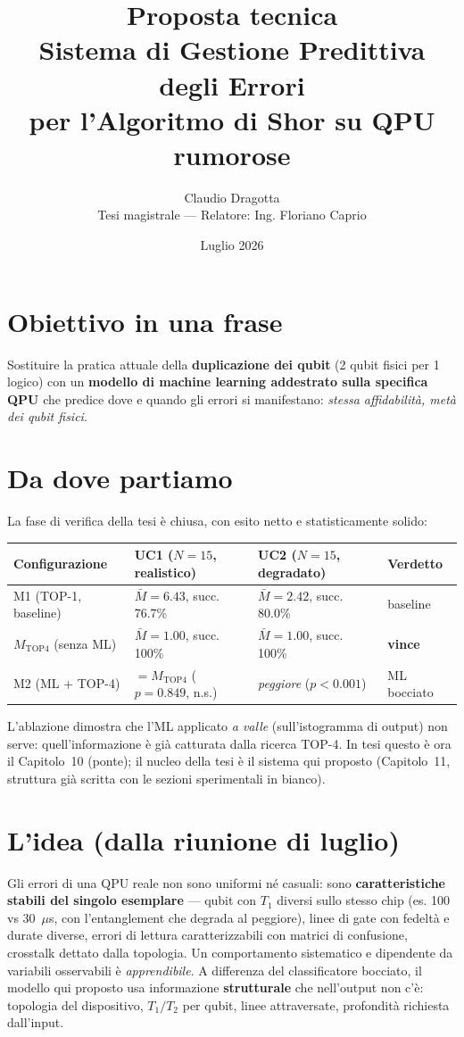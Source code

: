 \documentclass[11pt,a4paper]{article}
\title{\textbf{Proposta tecnica}\\[2mm]\Large Sistema di Gestione Predittiva degli Errori\\per l'Algoritmo di Shor su QPU rumorose}
\author{Claudio Dragotta\\\small Tesi magistrale --- Relatore: Ing. Floriano Caprio}
\date{Luglio 2026}
\begin{document}
\maketitle
\onehalfspacing

\section*{Obiettivo in una frase}
Sostituire la pratica attuale della \textbf{duplicazione dei qubit} (2 qubit fisici per 1 logico) con un \textbf{modello di machine learning addestrato sulla specifica QPU} che predice dove e quando gli errori si manifestano: \emph{stessa affidabilità, metà dei qubit fisici}.

\section{Da dove partiamo}
La fase di verifica della tesi è chiusa, con esito netto e statisticamente solido:

\begin{center}
\begin{tabular}{llll}
\toprule
\textbf{Configurazione} & \textbf{UC1} ($N{=}15$, realistico) & \textbf{UC2} ($N{=}15$, degradato) & \textbf{Verdetto} \\
\midrule
M1 (TOP-1, baseline) & $\bar{M}=6.43$, succ. 76.7\% & $\bar{M}=2.42$, succ. 80.0\% & baseline \\
$M_{\text{TOP4}}$ (senza ML) & $\bar{M}=1.00$, succ. 100\% & $\bar{M}=1.00$, succ. 100\% & \textbf{vince} \\
M2 (ML + TOP-4) & $=M_{\text{TOP4}}$ ($p=0.849$, n.s.) & \emph{peggiore} ($p<0.001$) & ML bocciato \\
\bottomrule
\end{tabular}
\end{center}

L'ablazione dimostra che l'ML applicato \emph{a valle} (sull'istogramma di output) non serve: quell'informazione è già catturata dalla ricerca TOP-4. In tesi questo è ora il Capitolo~10 (ponte); il nucleo della tesi è il sistema qui proposto (Capitolo~11, struttura già scritta con le sezioni sperimentali in bianco).

\section{L'idea (dalla riunione di luglio)}
Gli errori di una QPU reale non sono uniformi né casuali: sono \textbf{caratteristiche stabili del singolo esemplare} --- qubit con $T_1$ diversi sullo stesso chip (es. 100 vs 30~$\mu$s, con l'entanglement che degrada al peggiore), linee di gate con fedeltà e durate diverse, errori di lettura caratterizzabili con matrici di confusione, crosstalk dettato dalla topologia. Un comportamento sistematico e dipendente da variabili osservabili è \emph{apprendibile}. A differenza del classificatore bocciato, il modello qui proposto usa informazione \textbf{strutturale} che nell'output non c'è: topologia del dispositivo, $T_1/T_2$ per qubit, linee attraversate, profondità richiesta dall'input.
\end{document}
